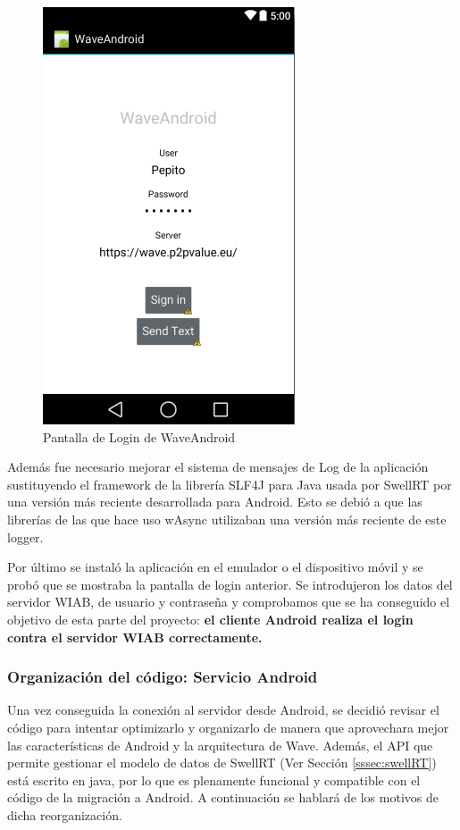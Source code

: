     	\begin{figure}[H]
      \centering
	\includegraphics[keepaspectratio, scale=0.6]{Media/Captures/waveAndroidLogin.png}
      \caption{Pantalla de Login de WaveAndroid}
      \label{fig:android_waveLogin}
    \end{figure}
    
    Además fue necesario mejorar el sistema de mensajes de Log de la aplicación sustituyendo el framework de la librería SLF4J para Java usada por SwellRT por una versión más reciente desarrollada para Android\cite{ref:slf4j_android}. Esto se debió a que las librerías de las que hace uso wAsync utilizaban una versión más reciente de este logger.
        
    Por último se instaló la aplicación en el emulador o el dispositivo móvil y se probó que se mostraba la pantalla de login anterior. Se introdujeron los datos del servidor WIAB, de usuario y contraseña y comprobamos que se ha conseguido el objetivo de esta parte del proyecto: \textbf{el cliente Android realiza el login contra el servidor WIAB correctamente.} 
     
    		\subsubsection{Organización del código: Servicio Android}\label{sssec:orgCodServAnd}
    
    Una vez conseguida la conexión al servidor desde Android, se decidió revisar el código para intentar optimizarlo y organizarlo de manera que aprovechara mejor las características de Android y la arquitectura de Wave. Además, el API que permite gestionar el modelo de datos de SwellRT (Ver Sección \ref{sssec:swellRT}) está escrito en java, por lo que es plenamente funcional y compatible con el código de la migración a Android. A continuación se hablará de los motivos de dicha reorganización.
  
